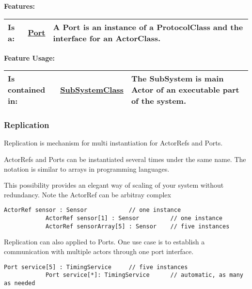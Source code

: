 		
	\begingroup
	\textbf{Features:}
	\renewcommand{\arraystretch}{1.8} %
	\begin{longtable}{l|l p{}}
		\hline
	Is a: & \tabitem \hyperlink{ref:Port}{Port}  & A Port is an instance of a ProtocolClass and the interface for an ActorClass.\\
	\hline
	\end{longtable}
	\endgroup
		
	\begingroup
	\textbf{Feature Usage:}
	\renewcommand{\arraystretch}{1.8} %
	\begin{longtable}{l|l p{}}
		\hline
	Is contained in: & \tabitem \hyperlink{ref:SubSystemClass}{SubSystemClass}  & The SubSystem is main Actor of an executable part of the system. \\
	\hline
	\end{longtable}
	\endgroup
		
	
	\vspace{\baselineskip}
	\vspace{\baselineskip}
	\vspace{\baselineskip}
	
\subsubsection{Replication}
	\hypertarget{ref:Replication}{}
	Replication is mechanism for multi instantiation for ActorRefs and Ports.
		
		ActorRefs and Ports can be instantiated several times under the same name. The notation is similar to arrays in programming languages.
	
		This possibility provides an elegant way of scaling of your system without redundancy. Note the ActorRef can be arbitray complex
		\begin{lstlisting}[language=ROOM]
			ActorRef sensor : Sensor 			// one instance
			ActorRef sensor[1] : Sensor			// one instance
			ActorRef sensorArray[5] : Sensor	// five instances  
		\end{lstlisting}
		
		Replication can also applied to Ports. One use case is to establish a communication with multiple actors through one port interface.
		\begin{lstlisting}[language=ROOM]
			Port service[5] : TimingService 	// five instances
			Port service[*]: TimingService		// automatic, as many as needed
		\end{lstlisting}
		
